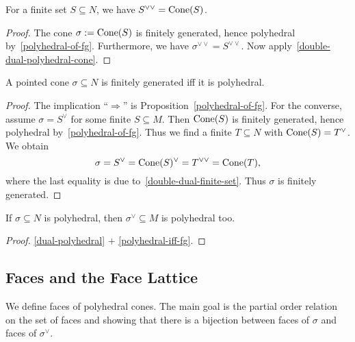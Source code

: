 \begin{proposition}
  \label{double-dual-finite-set}
  \uses{}
  \leanok
  For a finite set \( S \subseteq N \), we have \( S^{\vee\vee} =
  \operatorname{Cone}(S) \).
\end{proposition}
\begin{proof}
  \leanok
  The cone \( \sigma := \operatorname{Cone}(S) \) is finitely generated, hence
  polyhedral by~\ref{polyhedral-of-fg}. Furthermore, we have \(
  \sigma^{\vee\vee} = S^{\vee\vee} \). Now
  apply~\ref{double-dual-polyhedral-cone}.
\end{proof}

\begin{proposition}[Polyhedral = Finitely generated]
  \label{polyhedral-iff-fg}
  \uses{}
  \leanok
  A pointed cone \( \sigma \subseteq N \) is finitely generated iff it is
  polyhedral.
\end{proposition}
\begin{proof}
  \leanok
  The implication ``\( \Rightarrow \)'' is
  Proposition~\ref{polyhedral-of-fg}. For the converse, assume
  \( \sigma = S^{\vee} \) for some finite \( S \subseteq M \). Then \(
  \operatorname{Cone}(S) \) is finitely generated, hence polyhedral
  by~\ref{polyhedral-of-fg}. Thus we find a finite \( T
  \subseteq N \) with \( \operatorname{Cone}(S) = T^\vee \). We obtain
  \[
      \sigma = S^{\vee} = \operatorname{Cone}(S)^\vee = T^{\vee\vee} = \operatorname{Cone}(T),
  \]
  where the last equality is due
  to~\ref{double-dual-finite-set}. Thus \( \sigma \) is finitely
  generated.
\end{proof}

\begin{proposition}
  \label{dual-polyhedral-cone}
  \leanok
  If \( \sigma \subseteq N \) is
  polyhedral, then \( \sigma^\vee \subseteq M \) is polyhedral too.
\end{proposition}
\begin{proof}
  \leanok
  \ref{dual-polyhedral} \( + \) \ref{polyhedral-iff-fg}.
\end{proof}


\subsection{Faces and the Face Lattice}

We define faces of polyhedral cones. The main goal is the partial
order relation on the set of faces and showing that there is a
bijection between faces of \( \sigma \) and faces of \( \sigma^{\vee}
\).

